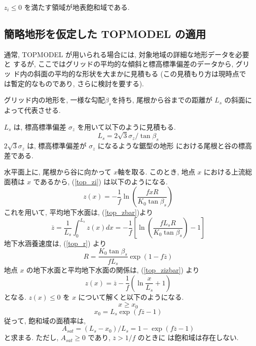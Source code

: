$z_i \leq 0$ を満たす領域が地表飽和域である. 

\subsection{簡略地形を仮定した TOPMODEL の適用}

通常, TOPMODEL が用いられる場合には, 対象地域の詳細な地形データを必要と
するが, ここではグリッドの平均的な傾斜と標高標準偏差のデータから, グリッ
ド内の斜面の平均的な形状を大まかに見積もる
(この見積もり方は現時点では暫定的なものであり, さらに検討を要する). 

グリッド内の地形を, 一様な勾配$\beta_s$を持ち, 尾根から谷までの距離が
$L_s$ の斜面によって代表させる. 

$L_s$ は, 標高標準偏差 $\sigma_z$ を用いて以下のように見積もる. 
\begin{equation}
 L_s = 2\sqrt{3} \sigma_z / \tan\beta_s
\end{equation}
$2\sqrt{3}\sigma_z$ は, 標高標準偏差が $\sigma_z$ になるような鋸型の地形
における尾根と谷の標高差である. 

水平面上に, 尾根から谷に向かって $x$軸を取る. 
このとき, 地点 $x$ における上流総面積は $x$ であるから, (\ref{top_zi})
は以下のようになる. 
\begin{equation}
 z(x) = - \frac{1}{f} \ln \left( \frac{fxR}{K_0 \tan \beta_s}\right)
\end{equation}
これを用いて, 平均地下水面は, (\ref{top_zbar})より
\begin{equation}
 \overline{z} = \frac 1{L_s}\int_0^{L_s} z(x) dx 
 = - \frac1{f}\left[
 \ln \left( \frac{f L_s R}{K_0 \tan\beta_s}\right) -1
\right]
\end{equation}
地下水涵養速度は, (\ref{top_r}) より
\begin{equation}
 R = \frac{K_0 \tan\beta_s}{f L_s}\exp(1-f \overline{z})
\label{top_rb}
\end{equation}
地点 $x$ の地下水面と平均地下水面の関係は, (\ref{top_zizbar}) より
\begin{equation}
 z(x) = \overline{z} - \frac{1}{f}\left(
\ln \frac{x}{L_s} + 1
\right)
\end{equation}
となる. 
$z(x) \leq 0$ を $x$ について解くと以下のようになる. 
\begin{equation}
 x \geq x_0
\end{equation}
\begin{equation}
x_0 = L_s \exp(f\overline{z}-1)
 \end{equation}
従って, 飽和域の面積率は, 
\begin{equation}
 A_{sat} = (L_s - x_0)/ L_s = 1 - \exp(f\overline{z}-1)
\label{top_asat}
\end{equation}
と求まる. ただし, $A_{sat} \geq 0$ であり, $\overline{z} > 1/f$ のときに
は飽和域は存在しない. 

